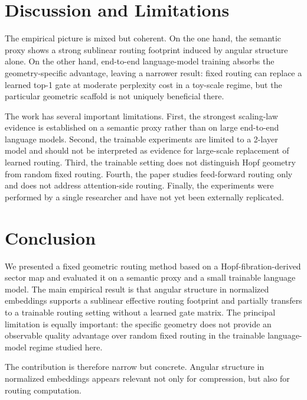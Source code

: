 \documentclass[10pt,conference]{IEEEtran}
\begin{document}
\section{Discussion and Limitations}
The empirical picture is mixed but coherent. On the one hand, the semantic proxy shows a strong sublinear routing footprint induced by angular structure alone. On the other hand, end-to-end language-model training absorbs the geometry-specific advantage, leaving a narrower result: fixed routing can replace a learned top-1 gate at moderate perplexity cost in a toy-scale regime, but the particular geometric scaffold is not uniquely beneficial there.

The work has several important limitations. First, the strongest scaling-law evidence is established on a semantic proxy rather than on large end-to-end language models. Second, the trainable experiments are limited to a 2-layer model and should not be interpreted as evidence for large-scale replacement of learned routing. Third, the trainable setting does not distinguish Hopf geometry from random fixed routing. Fourth, the paper studies feed-forward routing only and does not address attention-side routing. Finally, the experiments were performed by a single researcher and have not yet been externally replicated.

\section{Conclusion}
We presented a fixed geometric routing method based on a Hopf-fibration-derived sector map and evaluated it on a semantic proxy and a small trainable language model. The main empirical result is that angular structure in normalized embeddings supports a sublinear effective routing footprint and partially transfers to a trainable routing setting without a learned gate matrix. The principal limitation is equally important: the specific geometry does not provide an observable quality advantage over random fixed routing in the trainable language-model regime studied here.

The contribution is therefore narrow but concrete. Angular structure in normalized embeddings appears relevant not only for compression, but also for routing computation.
\end{document}
